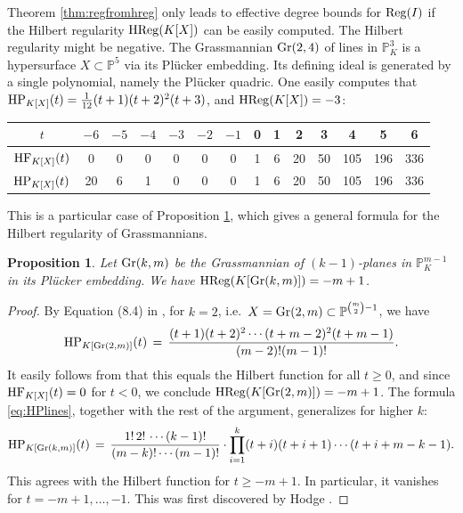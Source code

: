 \documentclass[12pt]{article}
\newtheorem{prop}[thm]{Proposition}
\theoremstyle{definition}
\newenvironment{example}
  {\pushQED{\qed}\renewcommand{\qedsymbol}{$\diamond$}\examplex}
  {\popQED\endexamplex}
\theoremstyle{remark}
\begin{document}
Theorem \ref{thm:regfromhreg} only leads to effective degree bounds for ${\rm Reg}(I)$ if the Hilbert regularity ${\rm HReg}(K[X])$ can be easily computed.  
\begin{example}[lines in $\mathbb{P}_K^{3}$]
    The Hilbert regularity might be negative. The Grassmannian ${\rm Gr}(2,4)$ of lines in $\mathbb{P}_K^3$ is a hypersurface $X \subset \mathbb{P}^5$ via its Pl\"ucker embedding. Its defining ideal is generated by a single polynomial, namely the Pl\"ucker quadric. One easily computes that ${\rm HP}_{K[X]}(t) = \frac{1}{12}(t+1)(t+2)^2(t+3)$, and ${\rm HReg}(K[X]) = -3$: 
    \begin{center}
\begin{tabular}{c|ccccccccccccc}
 $t$ & $-6$ &  $-5$ & $-4$   & $-3$ & $-2$ & $-1$ & 0 & 1 & 2 & 3 & 4 & 5 & 6  \\ \hline
 ${\rm HF}_{K[X]}(t)$& 0  & 0  & 0  & 0 & 0 & 0 & 1 & 6 & 20 & 50 & 105 & 196 & 336  \\
 ${\rm HP}_{K[X]}(t)$& 20 & 6 & 1 & 0 & 0 & 0 & 1  & 6 & 20 & 50 & 105 & 196 & 336 \\
\end{tabular}
    \end{center}
    This is a particular case of Proposition \ref{prop:hreggrass}, which gives a general formula for the Hilbert regularity of Grassmannians.
\end{example}

\begin{prop} \label{prop:hreggrass}
Let ${\rm Gr}(k,m)$ be the Grassmannian of $(k-1)$-planes in $\mathbb{P}_K^{m-1}$ in its Pl\"ucker embedding. We have ${\rm HReg}(K[{\rm Gr}(k,m)]) = -m+1$.
\end{prop}
\begin{proof}
 By Equation (8.4) in \cite{mukai2003introduction}, for $k = 2$, i.e.~$X = {\rm Gr}(2,m) \subset \mathbb{P}^{\binom{m}{2}-1}$, we have 
\begin{equation} \label{eq:HPlines}
{\rm HP}_{K[{\rm Gr}(2,m)]}(t)  \, = \, \frac{(t+1)(t+2)^2 \cdots (t+m-2)^2(t+m-1)}{(m-2)!(m-1)!}.
\end{equation}
It easily follows from \cite[Proposition 8.4]{mukai2003introduction} that this equals the Hilbert function for all $t \geq 0$, and since ${\rm HF}_{K[X]}(t) = 0$ for $t < 0$, we conclude ${\rm HReg}(K[{\rm Gr}(2,m)]) = -m + 1$. The formula \eqref{eq:HPlines}, together with the rest of the argument, generalizes for higher $k$: 
\begin{equation} \label{eq:HPgrass}
    {\rm HP}_{K[{\rm Gr}(k,m)]}(t)  \, = \,  \frac{1!\,2!\, \cdots (k-1)!}{(m-k)! \cdots (m-1)!} \cdot   \prod_{i=1}^k (t+i)(t+i+1) \cdots (t+i+m-k-1). 
\end{equation}
This agrees with the Hilbert function for $t \geq -m +1$. In particular, it vanishes for $t = -m+1, \ldots, -1$. This was first discovered by Hodge \cite{hodge1942note}.
\end{proof}
\end{document}
